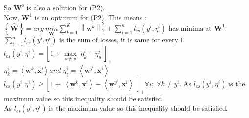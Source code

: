 \documentclass[a4paper,11pt]{article}
\begin{document}
\begin{mlsolution}
So \begin{math}\textbf{W}^{0}\end{math} is also a solution for (P2).\\

Now, \begin{math}\textbf{W}^{1}\end{math} is an optimum for (P2). This means :\\

\begin{math}\left \{ \widehat{\textbf{W}} \right \} = \underset{\textbf{}}{arg} \; \underset{  \textbf{W}}{min} \sum_{k=1}^{K} \left \| \textbf{w}^{k} \right \|^{2}_{2} + \sum_{i=1}^{n} l _{cs}\left ( y^{i}, \eta ^{i} \right )\end{math} has minima at \begin{math}\textbf{W}^{1}\end{math}.\\

\begin{math}
\sum_{i=1}^{n} l_{cs} (y^{i}, \eta^{i}) 
\end{math} is the sum of losses, it is same for every \textbf{i}.\\

\begin{math}l_{cs}(y^{i}, \eta^{i}) =   \left [  1 + \underset{k\neq y}{\max} \;\eta_{k}^{i} - \eta_{y} ^{i}\;\right ]_{+}\end{math}\\

\begin{math}
\eta_{k} ^{i} = \left \langle \textbf{w}^{k}, \textbf{x}^{i} \right \rangle  and \;\eta_{y} ^{i} = \left \langle \textbf{w}^{y^{i}}, \textbf{x}^{i} \right \rangle
\end{math}\\

\begin{math}l_{cs}(y^{i}, \eta^{i}) \geq \left [  1 +  \;\left \langle \textbf{w}^{k}, \textbf{x}^{i} \right \rangle - \left \langle \textbf{w}^{y^{i}}, \textbf{x}^{i} \right \rangle\;\right ]_{+}\forall i; \;\forall k \neq y^{i}\end{math}. 
As \begin{math}l_{cs}(y^{i}, \eta^{i})\end{math} is the maximum value so this inequality should be satisfied. \\
As \begin{math}l_{cs}(y^{i}, \eta^{i})\end{math} is the maximum value so this inequality should be satisfied. \\


\end{mlsolution}
\end{document}
